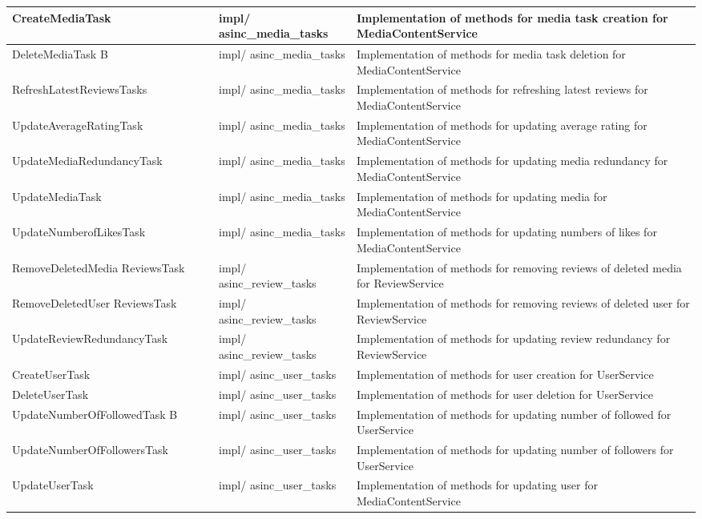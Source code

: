 \begin{longtable}{|>{\raggedright\arraybackslash}p{0.3\linewidth}|>{\raggedright\arraybackslash}p{0.2\linewidth}|>{\raggedright\arraybackslash}p{0.5\linewidth}|}
    CreateMediaTask & impl/ asinc\_media\_tasks & Implementation of methods for media task creation for MediaContentService \\
    \hline
    DeleteMediaTask B & impl/ asinc\_media\_tasks & Implementation of methods for media task deletion for MediaContentService \\
    \hline
    RefreshLatestReviewsTasks & impl/ asinc\_media\_tasks & Implementation of methods for refreshing latest reviews for MediaContentService \\
    \hline
    UpdateAverageRatingTask & impl/ asinc\_media\_tasks & Implementation of methods for updating average rating for MediaContentService \\
    \hline
    UpdateMediaRedundancyTask & impl/ asinc\_media\_tasks & Implementation of methods for updating media redundancy for MediaContentService \\
    \hline
    UpdateMediaTask & impl/ asinc\_media\_tasks & Implementation of methods for updating media for MediaContentService \\
    \hline
    UpdateNumberofLikesTask & impl/ asinc\_media\_tasks & Implementation of methods for updating numbers of likes for MediaContentService \\
    \hline
    RemoveDeletedMedia ReviewsTask & impl/ asinc\_review\_tasks & Implementation of methods for removing reviews of deleted media for ReviewService \\
    \hline
    RemoveDeletedUser ReviewsTask & impl/ asinc\_review\_tasks & Implementation of methods for removing reviews of deleted user for ReviewService \\
    \hline
    UpdateReviewRedundancyTask & impl/ asinc\_review\_tasks & Implementation of methods for updating review redundancy for ReviewService \\
    \hline
    CreateUserTask & impl/ asinc\_user\_tasks & Implementation of methods for user creation for UserService \\
    \hline
    DeleteUserTask & impl/ asinc\_user\_tasks & Implementation of methods for user deletion for UserService \\
    \hline
    UpdateNumberOfFollowedTask B & impl/ asinc\_user\_tasks & Implementation of methods for updating number of followed for UserService \\
    \hline
    UpdateNumberOfFollowersTask & impl/ asinc\_user\_tasks & Implementation of methods for updating number of followers for UserService \\
    \hline
    UpdateUserTask & impl/ asinc\_user\_tasks & Implementation of methods for updating user for MediaContentService \\

\end{longtable}
